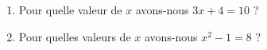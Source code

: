 
\begin{exercice}\label{exoSeconde-0046}

    \begin{enumerate}
        \item
            Pour quelle valeur de \( x\) avons-nous \( 3x+4=10\) ?
        \item
            Pour quelles valeurs de \( x\) avons-nous \( x^2-1=8\) ?
    \end{enumerate}

\end{exercice}
